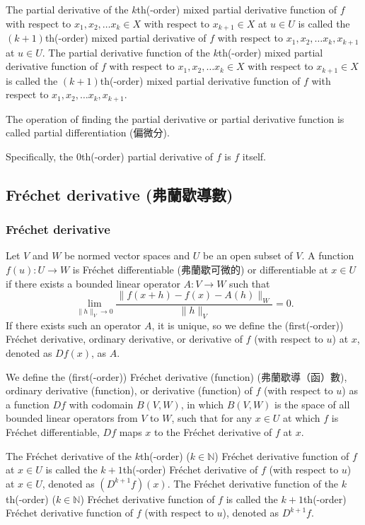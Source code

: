 The partial derivative of the $k$th(-order) mixed partial derivative function of $f$ with respect to $ x_1, x_2,\dots  x_k\in X$ with respect to $ x_{k+1}\in X$ at $u\in U$ is called the $(k+1)$th(-order) mixed partial derivative of $f$ with respect to $ x_1, x_2,\dots  x_k, x_{k+1}$ at $u\in U$. The partial derivative function of the $k$th(-order) mixed partial derivative function of $f$ with respect to $ x_1, x_2,\dots  x_k\in X$ with respect to $ x_{k+1}\in X$ is called the $(k+1)$th(-order) mixed partial derivative function of $f$ with respect to $ x_1, x_2,\dots  x_k, x_{k+1}$.

The operation of finding the partial derivative or partial derivative function is called partial differentiation (偏微分).

Specifically, the $0$th(-order) partial derivative of $f$ is $f$ itself.
\subsection{Fréchet derivative (弗蘭歇導數)}
\subsubsection{Fréchet derivative}
Let $V$ and $W$ be normed vector spaces and $U$ be an open subset of $V$. A function $f(u)\colon U\to W$ is Fréchet differentiable (弗蘭歇可微的) or differentiable at $x\in U$ if there exists a bounded linear operator $A\colon V\to W$ such that
\[\lim_{\|h\|_V\to 0}\frac{\|f(x+h)-f(x)-A(h)\|_W}{\|h\|_V}=0.\]
If there exists such an operator $A$, it is unique, so we define the (first(-order)) Fréchet derivative, ordinary derivative, or derivative of $f$ (with respect to $u$) at $x$, denoted as $Df(x)$, as $A$.

We define the (first(-order)) Fréchet derivative (function) (弗蘭歇導（函）數), ordinary derivative (function), or derivative (function) of $f$ (with respect to $u$) as a function $Df$ with codomain $B(V,W)$, in which $B(V,W)$ is the space of all bounded linear operators from $V$ to $W$, such that for any $x\in U$ at which $f$ is Fréchet differentiable, $Df$ maps $x$ to the Fréchet derivative of $f$ at $x$.

The Fréchet derivative of the $k$th(-order) ($k\in\mathbb{N}$) Fréchet derivative function of $f$ at $x\in U$ is called the $k+1$th(-order) Fréchet derivative of $f$ (with respect to $u$) at $x\in U$, denoted as $(D^{k+1}f)(x)$. The Fréchet derivative function of the $k$th(-order) ($k\in\mathbb{N}$) Fréchet derivative function of $f$ is called the $k+1$th(-order) Fréchet derivative function of $f$ (with respect to $u$), denoted as $D^{k+1}f$.

